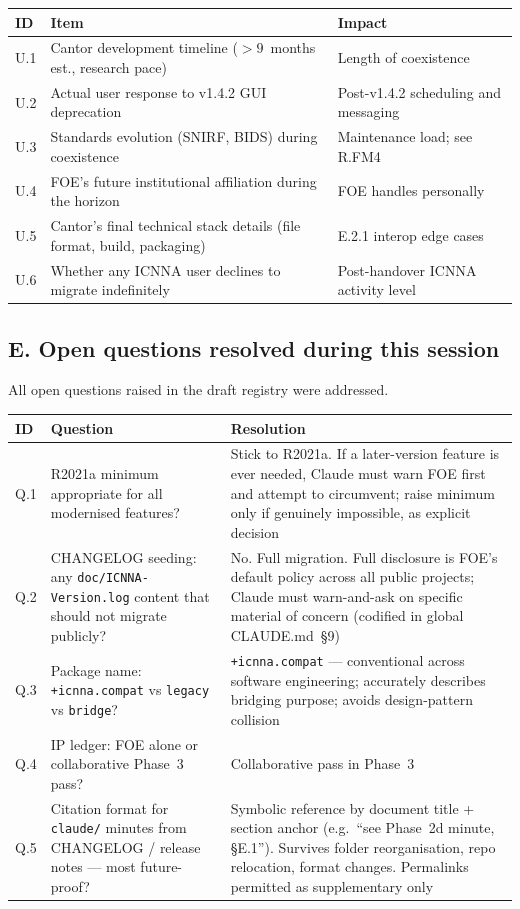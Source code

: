 \documentclass[11pt,a4paper]{article}
\begin{document}
\begin{longtable}{p{1.5cm}p{9cm}p{4cm}}
\toprule
\textbf{ID} & \textbf{Item} & \textbf{Impact} \\
\midrule
\endhead
U.1 & Cantor development timeline ($>9$~months est., research pace) & Length of coexistence \\
U.2 & Actual user response to v1.4.2 GUI deprecation & Post-v1.4.2 scheduling and messaging \\
U.3 & Standards evolution (SNIRF, BIDS) during coexistence & Maintenance load; see R.FM4 \\
U.4 & FOE's future institutional affiliation during the horizon & FOE handles personally \\
U.5 & Cantor's final technical stack details (file format, build, packaging) & E.2.1 interop edge cases \\
U.6 & Whether any ICNNA user declines to migrate indefinitely & Post-handover ICNNA activity level \\
\bottomrule
\end{longtable}

\subsection{E. Open questions resolved during this session}

All open questions raised in the draft registry were addressed.

\begin{longtable}{p{1.5cm}p{6cm}p{7cm}}
\toprule
\textbf{ID} & \textbf{Question} & \textbf{Resolution} \\
\midrule
\endhead
Q.1 & R2021a minimum appropriate for all modernised features? & Stick to R2021a. If a later-version feature is ever needed, Claude must warn FOE first and attempt to circumvent; raise minimum only if genuinely impossible, as explicit decision \\
Q.2 & CHANGELOG seeding: any \texttt{doc/ICNNA-Version.log} content that should not migrate publicly? & No. Full migration. Full disclosure is FOE's default policy across all public projects; Claude must warn-and-ask on specific material of concern (codified in global CLAUDE.md~§9) \\
Q.3 & Package name: \texttt{+icnna.compat} vs \texttt{legacy} vs \texttt{bridge}? & \texttt{+icnna.compat} --- conventional across software engineering; accurately describes bridging purpose; avoids design-pattern collision \\
Q.4 & IP ledger: FOE alone or collaborative Phase~3 pass? & Collaborative pass in Phase~3 \\
Q.5 & Citation format for \texttt{claude/} minutes from CHANGELOG / release notes --- most future-proof? & Symbolic reference by document title + section anchor (e.g.\ ``see Phase~2d minute, §E.1''). Survives folder reorganisation, repo relocation, format changes. Permalinks permitted as supplementary only \\
\bottomrule
\end{longtable}
\end{document}
